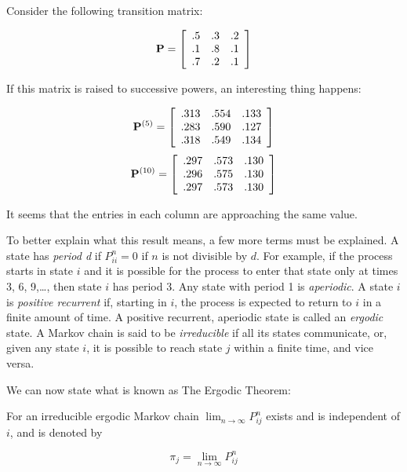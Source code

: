 Consider the following transition matrix:
\begin{center}
\[ {\bf P} = \left[ \begin{array}{ccc}
                        .5 & .3 & .2 \\
                        .1 & .8 & .1 \\
                        .7 & .2 & .1 \\
               		\end{array} \right] \]
\end{center}
If this matrix is raised to successive powers, an interesting thing happens:
\begin{center}
\[ {\bf P}^{(5)} = \left[ \begin{array}{ccc}
                        .313 & .554 & .133 \\
                        .283 & .590 & .127 \\
                        .318 & .549 & .134 \\
                        \end{array} \right] \]
\[{\bf P}^{(10)} = \left[ \begin{array}{ccc}
                        .297 & .573 & .130 \\
                        .296 & .575 & .130 \\
                        .297 & .573 & .130 \\
                        \end{array} \right] \]
\end{center}
It seems that the entries in each column are approaching the same value.    

To better explain what this result means, a few more terms must be
explained. A state has {\em period d} if $P_{ii}^{n}=0$ if $n$ is not
divisible by $d$. For example, if the process starts in state $i$ and
it is possible for the  process to enter that state only at times 3,
6, 9,\ldots, then state $i$ has period 3.  Any state with period 1 is
{\em aperiodic}.  A state $i$ is  {\em positive recurrent} if,
starting in $i$, the process is expected to return to $i$ in a finite
amount of time.  A positive recurrent, aperiodic state is  called an
{\em ergodic} state.  A Markov chain is said to be {\em irreducible}
if all its states communicate, or, given any state $i$, it is possible
to reach state $j$ within a finite  time, and vice versa. 

We can now state what is known as The Ergodic Theorem:

For an irreducible ergodic Markov chain \( \lim_{n \rightarrow \infty}
P_{ij}^{n} \) exists and is independent of $i$, and is denoted by 
\begin{center}
\[ \pi_{j}=\lim_{n \rightarrow \infty} P_{ij}^{n}
 \]
\end{center}

